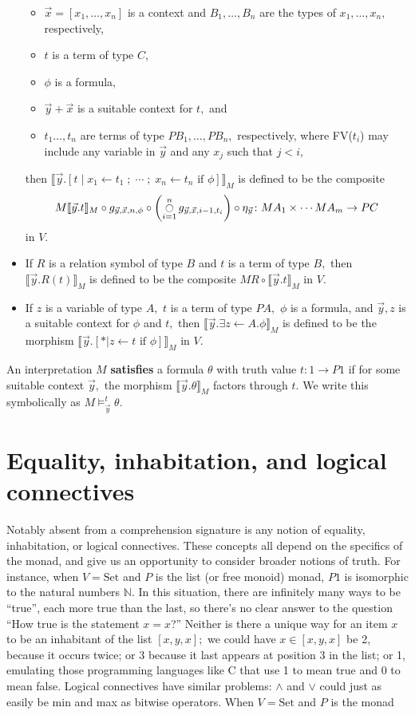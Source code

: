 \documentclass{article}
\newcommand{\maps}{\colon}
\newcommand{\interp}[1]{\llbracket #1 \rrbracket}
\newcommand{\iym}[1]{\interp{\vec{y}.#1}_M}
\begin{document}
\begin{itemize}
\begin{itemize}
      \item $\vec{x} = [x_1, \ldots, x_n]$ is a context and $B_1, \ldots, B_n$ are the types of $x_1, \ldots, x_n,$ respectively,
      \item $t$ is a term of type $C,$ 
      \item $\phi$ is a formula,
      \item $\vec{y} + \vec{x}$ is a suitable context for $t,$ and
      \item $t_1 \ldots, t_n$ are terms of type $PB_1, \ldots, PB_n,$ respectively, where FV($t_i$) may include any variable in $\vec{y}$ and any $x_j$ such that $j < i,$
    \end{itemize} 
    then $\iym{[t \; |\; x_1 \leftarrow t_1 \;;\; \cdots \;;\; x_n \leftarrow t_n \mbox{ if } \phi]}$ is defined to be the composite
    \[ M\iym{t} \circ g_{\vec{y}, \vec{x}, n, \phi} \circ \left(\mathop{\fullmoon}_{i=1}^n g_{\vec{y}, \vec{x}, i-1, t_i}\right) \circ \eta_{\vec{y}}\maps MA_1 \times \cdots MA_m \to PC \]
    in $V.$
  \item If $R$ is a relation symbol of type $B$ and $t$ is a term of type $B,$ then $\iym{R(t)}$ is defined to be the composite $MR \circ \iym{t}$ in $V.$
  \item If $z$ is a variable of type $A,$ $t$ is a term of type $PA,$ $\phi$ is a formula, and $\vec{y}, z$ is a suitable context for $\phi$ and $t,$ then $\iym{\exists z\leftarrow A.\phi}$ is defined to be the morphism $\iym{[* | z \leftarrow t \mbox{ if } \phi]}$ in $V.$
\end{itemize}

An interpretation $M$ {\bf satisfies} a formula $\theta$ with truth value $t\maps 1 \to P1$ if for some suitable context $\vec{y},$ the morphism $\iym{\theta}$ factors through $t.$  We write this symbolically as $M \models^t_{\vec{y}} \theta.$

\section{Equality, inhabitation, and logical connectives}
Notably absent from a comprehension signature is any notion of equality, inhabitation, or logical connectives.  These concepts all depend on the specifics of the monad, and give us an opportunity to consider broader notions of truth.  For instance, when $V=\mbox{Set}$ and $P$ is the list (or free monoid) monad, $P1$ is isomorphic to the natural numbers $\mathbb{N}.$  In this situation, there are infinitely many ways to be ``true'', each more true than the last, so there's no clear answer to the question ``How true is the statement $x=x$?''  Neither is there a unique way for an item $x$ to be an inhabitant of the list $[x, y, x];$ we could have $x \in [x, y, x]$ be 2, because it occurs twice; or 3 because it last appears at position 3 in the list; or 1, emulating those programming languages like C that use 1 to mean true and 0 to mean false.  Logical connectives have similar problems: $\land$ and $\lor$ could just as easily be min and max as bitwise operators.  When $V=\mbox{Set}$ and $P$ is the monad 
\end{document}
